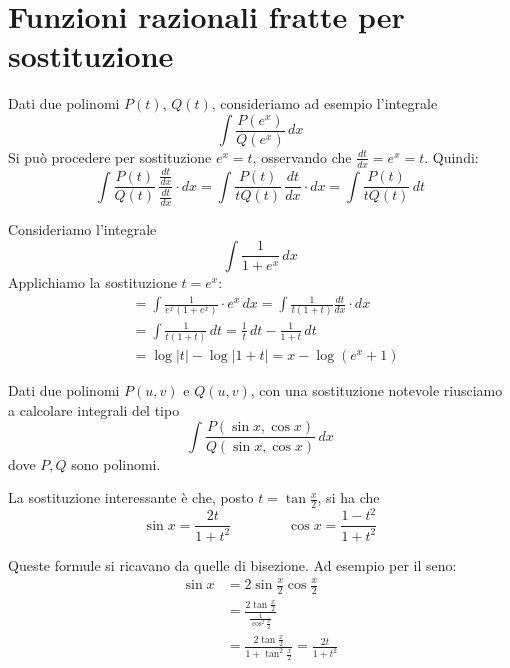 \section{Funzioni razionali fratte per sostituzione}

Dati due polinomi $P(t)$, $Q(t)$, consideriamo ad esempio l'integrale
\begin{equation*}
\int \frac{P(e^x)}{Q(e^x)} \, dx
\end{equation*}
Si può procedere per sostituzione $e^x = t$, osservando che $\frac{dt}{dx} = e^x = t$. Quindi:
\begin{equation*}
\int \frac{P(t)}{Q(t)} \, \frac{\frac{dt}{dx}}{\frac{dt}{dx}} \cdot dx = \int \frac{P(t)}{tQ(t)} \, \frac{dt}{dx} \cdot dx = 
\int \frac{P(t)}{tQ(t)} \, dt
\end{equation*}

\begin{example}
Consideriamo l'integrale
\begin{equation*}
\int \frac{1}{1+e^x} \, dx
\end{equation*}
Applichiamo la sostituzione $t = e^x$:
\begin{align*}
&= \int \frac{1}{e^x(1+e^x)} \cdot e^x \, dx = \int \frac{1}{t(1+t)} \frac{dt}{dx} \cdot dx \\
&= \int \frac{1}{t(1+t)} \, dt = \frac{1}{t} \, dt - \frac{1}{1+t} \, dt \\ 
&= \log |t| - \log |1+t| = x - \log(e^x+1)
\end{align*}
\end{example}

Dati due polinomi $P(u,v)$ e $Q(u,v)$, con una sostituzione notevole riusciamo a calcolare integrali del tipo
\begin{equation*}
\int \frac{P(\sin x, \cos x)}{Q(\sin x, \cos x)} \, dx
\end{equation*}
dove $P, Q$ sono polinomi.

La sostituzione interessante è che, posto $t = \tan \frac{x}{2}$, si ha che
\begin{equation*}
\sin x = \frac{2t}{1+t^2} \qquad \qquad \cos x = \frac{1-t^2}{1+t^2}
\end{equation*}

Queste formule si ricavano da quelle di bisezione. Ad esempio per il seno:
\begin{align*}
\sin x &= 2 \sin \frac{x}{2} \cos \frac{x}{2} \\
&= \frac{2\tan \frac{x}{2}}{\frac{1}{\cos^2 \frac{x}{2}}} \\
&= \frac{2\tan \frac{x}{2}}{1+\tan^2 \frac{x}{2}} = \frac{2t}{1+t^2}
\end{align*}

